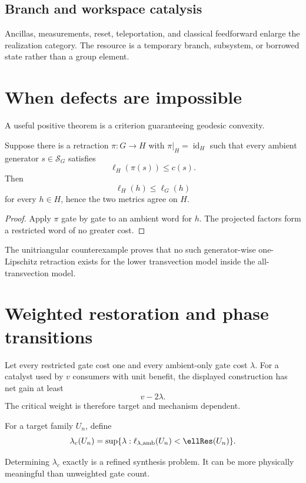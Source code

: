 \subsection{Branch and workspace catalysis}
Ancillas, measurements, reset, teleportation, and classical feedforward enlarge the realization category.  The resource is a temporary branch, subsystem, or borrowed state rather than a group element.

\section{When defects are impossible}
A useful positive theorem is a criterion guaranteeing geodesic convexity.
\begin{proposition}
Suppose there is a retraction $\pi:G\to H$ with $\pi|_H=\operatorname{id}_H$ such that every ambient generator $s\in\mathcal S_G$ satisfies
\[
\ell_H(\pi(s))\le c(s).
\]
Then
\[
\ell_H(h)\le\ell_G(h)
\]
for every $h\in H$, hence the two metrics agree on $H$.
\end{proposition}
\begin{proof}
Apply $\pi$ gate by gate to an ambient word for $h$.  The projected factors form a restricted word of no greater cost.
\end{proof}

The unitriangular counterexample proves that no such generator-wise one-Lipschitz retraction exists for the lower transvection model inside the all-transvection model.

\section{Weighted restoration and phase transitions}
Let every restricted gate cost one and every ambient-only gate cost $\lambda$.  For a catalyst used by $v$ consumers with unit benefit, the displayed construction has net gain at least
\[
v-2\lambda.
\]
The critical weight is therefore target and mechanism dependent.

\begin{definition}
For a target family $U_n$, define
\[
\lambda_c(U_n)
=
\sup\{\lambda:\ell_{\lambda,\mathrm{amb}}(U_n)<\ellRes(U_n)\}.
\]
\end{definition}
Determining $\lambda_c$ exactly is a refined synthesis problem.  It can be more physically meaningful than unweighted gate count.

